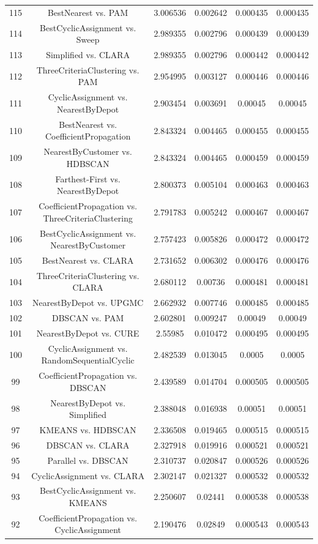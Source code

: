 \documentclass[a4paper,10pt]{article}
\begin{document}
\begin{landscape}
\begin{table}[!htp]
\begin{tabular}{cccccc}
115&BestNearest vs. PAM&3.006536&0.002642&0.000435&0.000435\\
114&BestCyclicAssignment vs. Sweep&2.989355&0.002796&0.000439&0.000439\\
113&Simplified vs. CLARA&2.989355&0.002796&0.000442&0.000442\\
112&ThreeCriteriaClustering vs. PAM&2.954995&0.003127&0.000446&0.000446\\
111&CyclicAssignment vs. NearestByDepot&2.903454&0.003691&0.00045&0.00045\\
110&BestNearest vs. CoefficientPropagation&2.843324&0.004465&0.000455&0.000455\\
109&NearestByCustomer vs. HDBSCAN&2.843324&0.004465&0.000459&0.000459\\
108&Farthest-First vs. NearestByDepot&2.800373&0.005104&0.000463&0.000463\\
107&CoefficientPropagation vs. ThreeCriteriaClustering&2.791783&0.005242&0.000467&0.000467\\
106&BestCyclicAssignment vs. NearestByCustomer&2.757423&0.005826&0.000472&0.000472\\
105&BestNearest vs. CLARA&2.731652&0.006302&0.000476&0.000476\\
104&ThreeCriteriaClustering vs. CLARA&2.680112&0.00736&0.000481&0.000481\\
103&NearestByDepot vs. UPGMC&2.662932&0.007746&0.000485&0.000485\\
102&DBSCAN vs. PAM&2.602801&0.009247&0.00049&0.00049\\
101&NearestByDepot vs. CURE&2.55985&0.010472&0.000495&0.000495\\
100&CyclicAssignment vs. RandomSequentialCyclic&2.482539&0.013045&0.0005&0.0005\\
99&CoefficientPropagation vs. DBSCAN&2.439589&0.014704&0.000505&0.000505\\
98&NearestByDepot vs. Simplified&2.388048&0.016938&0.00051&0.00051\\
97&KMEANS vs. HDBSCAN&2.336508&0.019465&0.000515&0.000515\\
96&DBSCAN vs. CLARA&2.327918&0.019916&0.000521&0.000521\\
95&Parallel vs. DBSCAN&2.310737&0.020847&0.000526&0.000526\\
94&CyclicAssignment vs. CLARA&2.302147&0.021327&0.000532&0.000532\\
93&BestCyclicAssignment vs. KMEANS&2.250607&0.02441&0.000538&0.000538\\
92&CoefficientPropagation vs. CyclicAssignment&2.190476&0.02849&0.000543&0.000543\\

\end{tabular}
\end{table}
\end{landscape}
\end{document}
